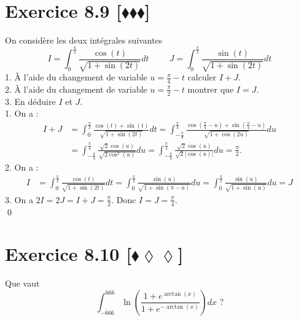 \documentclass[10pt]{article}
\begin{document}
\section*{Exercice 8.9 [$\blacklozenge\blacklozenge\blacklozenge$]}
\begin{tcolorbox}[enhanced, width=7in, center, size=fbox, fontupper=\large, drop shadow southwest]
    On considère les deux intégrales suivantes
    \begin{equation*}
        I=\int_0^{\frac{\pi}{2}}{\frac{\cos(t)}{\sqrt{1+\sin(2t)}}dt} \hspace{1cm} J=\int_0^{\frac{\pi}{2}}{\frac{\sin(t)}{\sqrt{1+\sin(2t)}}dt}
    \end{equation*}
    1. À l'aide du changement de variable $u=\frac{\pi}{4}-t$ calculer $I+J$.\\
    2. À l'aide du changement de variable $u=\frac{\pi}{2}-t$ montrer que $I=J$.\\
    3. En déduire $I$ et $J$.\\[0.1cm]
    1. On a :
    \begin{align*}
        I + J &= \int_0^{\frac{\pi}{2}}{\frac{\cos(t) + \sin(t)}{\sqrt{1+\sin(2t)}}dt}=\int_{-\frac{\pi}{4}}^{\frac{\pi}{4}}{\frac{\cos(\frac{\pi}{4}-u)+\sin(\frac{\pi}{4}-u)}{\sqrt{1+\cos(2u)}}du}\\
        &=\int_{-\frac{\pi}{4}}^{\frac{\pi}{4}}{\frac{\sqrt{2}\cos(u)}{\sqrt{2\cos^2(u)}}du}=\int_{-\frac{\pi}{4}}^{\frac{\pi}{4}}{\frac{\sqrt{2}\cos(u)}{\sqrt{2}|\cos(u)|}du}=\frac{\pi}{2}.
    \end{align*}
    2. On a :
    \begin{align*}
        I &= \int_0^{\frac{\pi}{2}}{\frac{\cos(t)}{\sqrt{1+\sin(2t)}}dt}=\int_0^{\frac{\pi}{2}}{\frac{\sin(u)}{\sqrt{1+\sin(\pi-u)}}du}=\int_0^{\frac{\pi}{2}}{\frac{\sin(u)}{\sqrt{1+\sin(u)}}du}=J
    \end{align*}
    3. On a $2I = 2J = I+J = \frac{\pi}{2}$. Donc $I = J = \frac{\pi}{4}$.\\
    \qed
\end{tcolorbox}


\section*{Exercice 8.10 [$\blacklozenge\lozenge\lozenge$]}
\begin{tcolorbox}[enhanced, width=7in, center, size=fbox, fontupper=\large, drop shadow southwest]
    Que vaut
    \begin{equation*}
        \int_{-666}^{666}{\ln\left(\frac{1+e^{\arctan(x)}}{1+e^{-\arctan(x)}}\right)dx} \text{ ?}
    \end{equation*}
\end{tcolorbox}
\end{document}
